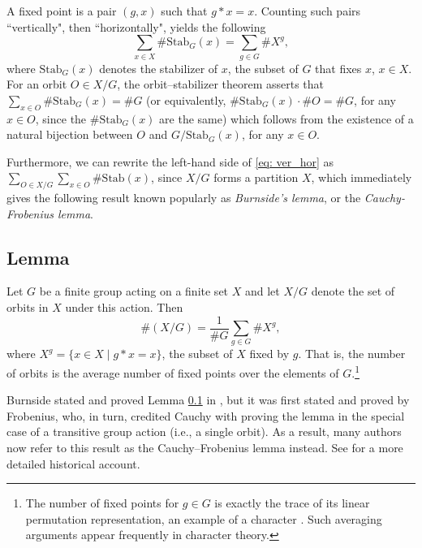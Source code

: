 \documentclass[a4paper,11pt]{article}
\numberwithin{equation}{section}
\begin{document}
    A fixed point is a pair $(g,x)$ such that $g*x = x$. Counting such pairs ``vertically", then ``horizontally", yields the following 
    \begin{equation}
        \sum_{x\in X} \# \text{Stab}_G(x)  = \sum_{g\in G} \# X^g,   \label{eq: ver_hor}\tag{1.1}
    \end{equation} where $\text{Stab}_G(x)$ denotes the stabilizer of $x$, the subset of $G$ that fixes $x$, $x\in X$. For an orbit $O\in X/G$, the orbit--stabilizer theorem asserts that $\sum_{x\in O} \# \text{Stab}_G(x) = \#G$ (or equivalently, $\#\text{Stab}_G(x)\cdot \#O = \#G$, for any $x\in O$, since the $\# \text{Stab}_G(x)$ are the same) which follows from the existence of a natural bijection between $O$ and $G/\text{Stab}_G(x)$, for any $x\in O$.  \smallskip
    
    Furthermore, we can rewrite the left-hand side of \eqref{eq: ver_hor} as \break $\sum_{O \in X/G} \sum_{x\in O} \# \text{Stab}(x)$, since $X/G$ forms a partition $X$, which immediately gives the following result known popularly as \textit{Burnside's lemma}, or the \textit{Cauchy-Frobenius lemma}.
    \subsection{Lemma} \label{lemma: burnside's} Let $G$ be a finite group acting on a finite set $X$ and let $X/G$ denote the set of orbits in $X$ under this action. Then \begin{equation*}
        \# (X \text{/} G) = \frac{1}{\# G} \sum_{g\in G} \# X^{g}, \label{eq: ch2} \tag{1.2}
    \end{equation*}  where $X^{g}=\{ x\in X \mid g*x=x \}$, the subset of $X$ fixed by $g$. That is, the number of orbits is the average number of fixed points over the elements of $G$.\footnote{The number of fixed points for $g\in G$ is exactly the trace of its linear permutation representation, an example of a character \cite{wiki:Permutation_representation}. Such averaging arguments appear frequently in character theory.} \medskip

    Burnside stated and proved Lemma \ref{lemma: burnside's} in \cite[Sects. 118–119]{Burnside1911},  but it was
    first stated and proved by Frobenius, who, in turn, credited Cauchy with proving the lemma in the special case of a transitive group action (i.e., a single orbit). As a result, many authors now refer to this result as the Cauchy–Frobenius lemma instead. See \cite{Neumann1979} for a more detailed historical account.
\end{document}
